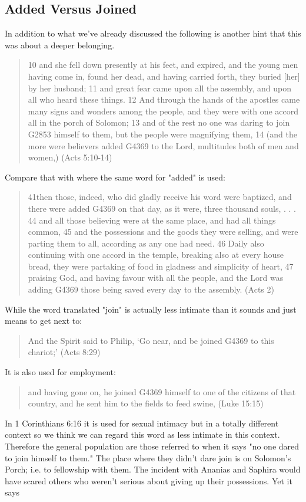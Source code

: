 \documentclass[11pt]{article}
\begin{document}
\subsection{Added Versus Joined} \label{added versus joined}
In addition to what we've already discussed the following is another hint that this was about a deeper belonging.
\begin{quote}
10 and she fell down presently at his feet, and expired, and the young men having come in, found her dead, and having carried forth, they buried [her] by her husband;
11 and great fear came upon all the assembly, and upon all who heard these things.
12 And through the hands of the apostles came many signs and wonders among the people, and they were with one accord all in the porch of Solomon;
13 and of the rest no one was daring to join G2853 himself to them, but the people were magnifying them,
14 (and the more were believers added G4369 to the Lord, multitudes both of men and women,) (Acts 5:10-14)
\end{quote}
Compare that with where the same word for "added" is used:
\begin{quote}
 41then those, indeed, who did gladly receive his word were baptized, and there were added G4369 on that day, as it were, three thousand souls, . . .
44 and all those believing were at the same place, and had all things common,
45 and the possessions and the goods they were selling, and were parting them to all, according as any one had need.
46 Daily also continuing with one accord in the temple, breaking also at every house bread, they were partaking of food in gladness and simplicity of heart,
47 praising God, and having favour with all the people, and the Lord was adding G4369 those being saved every day to the assembly. (Acts 2)
\end{quote}
While the word translated "join" is actually less intimate than it sounds and just means to get next to:
\begin{quote}
And the Spirit said to Philip, `Go near, and be joined G4369 to this chariot;'
(Acts 8:29)
\end{quote}
It is also used for employment:
\begin{quote}
and having gone on, he joined G4369 himself to one of the citizens of that country, and he sent him to the fields to feed swine,
(Luke 15:15)
\end{quote}
In 1 Corinthians 6:16 it is used for sexual intimacy but in a totally different context so we think we can regard this word as less intimate in this context. Therefore the general population are those referred to when it says "no one dared to join himself to them." The place where they didn't dare join is on Solomon's Porch; i.e. to fellowship with them. The incident with Ananias and Saphira would have scared others who weren't serious about giving up their possessions. Yet it says 
\end{document}
